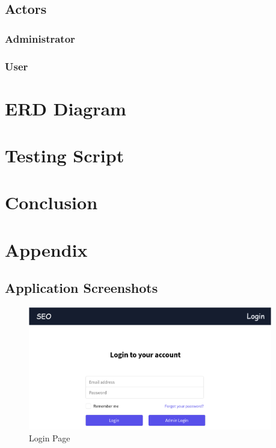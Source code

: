 \documentclass{scrartcl}
\begin{document}
\subsection{Actors}

\subsubsection{Administrator}

\subsubsection{User}

\section{ERD Diagram}

\section{Testing Script}

\section{Conclusion}

\newpage






\appendix
\section{Appendix}

\subsection{Application Screenshots}

\begin{figure}[H]
  \centering
  \includegraphics[width=0.95\textwidth]{login.png}
  \caption{Login Page}
\end{figure}
\end{document}
